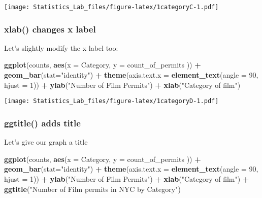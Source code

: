 \documentclass[
]{book}
\newenvironment{Shaded}{\begin{snugshade}}{\end{snugshade}}
\newcommand{\AttributeTok}[1]{\textcolor[rgb]{0.13,0.29,0.53}{#1}}
\newcommand{\DecValTok}[1]{\textcolor[rgb]{0.00,0.00,0.81}{#1}}
\newcommand{\FunctionTok}[1]{\textcolor[rgb]{0.13,0.29,0.53}{\textbf{#1}}}
\newcommand{\NormalTok}[1]{#1}
\newcommand{\SpecialCharTok}[1]{\textcolor[rgb]{0.81,0.36,0.00}{\textbf{#1}}}
\newcommand{\StringTok}[1]{\textcolor[rgb]{0.31,0.60,0.02}{#1}}
\begin{document}
\texttt{[image: Statistics\_Lab\_files/figure-latex/1categoryC-1.pdf]}

\hypertarget{xlab-changes-x-label}{%
\subsubsection{xlab() changes x label}\label{xlab-changes-x-label}}

Let's slightly modify the x label too:

\begin{Shaded}
\begin{Highlighting}[]
\FunctionTok{ggplot}\NormalTok{(counts, }\FunctionTok{aes}\NormalTok{(}\AttributeTok{x =}\NormalTok{ Category, }\AttributeTok{y =}\NormalTok{ count\_of\_permits )) }\SpecialCharTok{+}
  \FunctionTok{geom\_bar}\NormalTok{(}\AttributeTok{stat=}\StringTok{"identity"}\NormalTok{) }\SpecialCharTok{+} 
  \FunctionTok{theme}\NormalTok{(}\AttributeTok{axis.text.x =} \FunctionTok{element\_text}\NormalTok{(}\AttributeTok{angle =} \DecValTok{90}\NormalTok{, }\AttributeTok{hjust =} \DecValTok{1}\NormalTok{)) }\SpecialCharTok{+}
  \FunctionTok{ylab}\NormalTok{(}\StringTok{"Number of Film Permits"}\NormalTok{) }\SpecialCharTok{+} 
  \FunctionTok{xlab}\NormalTok{(}\StringTok{"Category of film"}\NormalTok{)}
\end{Highlighting}
\end{Shaded}

\texttt{[image: Statistics\_Lab\_files/figure-latex/1categoryD-1.pdf]}

\hypertarget{ggtitle-adds-title}{%
\subsubsection{ggtitle() adds title}\label{ggtitle-adds-title}}

Let's give our graph a title

\begin{Shaded}
\begin{Highlighting}[]
\FunctionTok{ggplot}\NormalTok{(counts, }\FunctionTok{aes}\NormalTok{(}\AttributeTok{x =}\NormalTok{ Category, }\AttributeTok{y =}\NormalTok{ count\_of\_permits )) }\SpecialCharTok{+}
  \FunctionTok{geom\_bar}\NormalTok{(}\AttributeTok{stat=}\StringTok{"identity"}\NormalTok{) }\SpecialCharTok{+} 
  \FunctionTok{theme}\NormalTok{(}\AttributeTok{axis.text.x =} \FunctionTok{element\_text}\NormalTok{(}\AttributeTok{angle =} \DecValTok{90}\NormalTok{, }\AttributeTok{hjust =} \DecValTok{1}\NormalTok{)) }\SpecialCharTok{+}
  \FunctionTok{ylab}\NormalTok{(}\StringTok{"Number of Film Permits"}\NormalTok{) }\SpecialCharTok{+} 
  \FunctionTok{xlab}\NormalTok{(}\StringTok{"Category of film"}\NormalTok{) }\SpecialCharTok{+}
  \FunctionTok{ggtitle}\NormalTok{(}\StringTok{"Number of Film permits in NYC by Category"}\NormalTok{)}
\end{Highlighting}
\end{Shaded}
\end{document}
